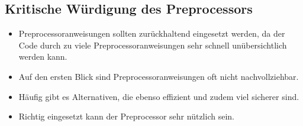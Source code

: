 \subsection{Kritische Würdigung des Preprocessors}
\begin{itemize}
	\item Preprocessoranweisungen sollten zurückhaltend eingesetzt werden, da der Code durch zu viele Preprocessoranweisungen sehr schnell unübersichtlich werden kann.
	\item Auf den ersten Blick sind Preprocessoranweisungen oft nicht nachvollziehbar.
	\item Häufig gibt es Alternativen, die ebenso effizient und zudem viel sicherer sind.
	\item Richtig eingesetzt kann der Preprocessor sehr nützlich sein.
\end{itemize}